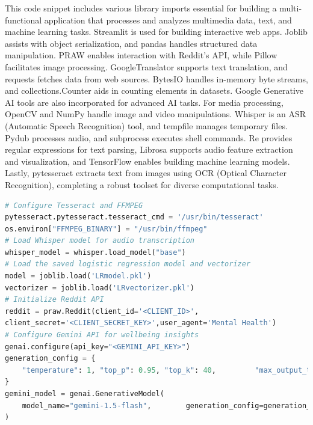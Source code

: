 \noindent
This code snippet includes various library imports essential for building a multi-functional application that processes and analyzes multimedia data, text, and machine learning tasks. Streamlit is used for building interactive web apps. Joblib assists with object serialization, and pandas handles structured data manipulation. PRAW enables interaction with Reddit's API, while Pillow facilitates image processing. GoogleTranslator supports text translation, and requests fetches data from web sources. BytesIO handles in-memory byte streams, and collections.Counter aids in counting elements in datasets. Google Generative AI tools are also incorporated for advanced AI tasks. For media processing, OpenCV and NumPy handle image and video manipulations. Whisper is an ASR (Automatic Speech Recognition) tool, and tempfile manages temporary files. Pydub processes audio, and subprocess executes shell commands. Re provides regular expressions for text parsing, Librosa supports audio feature extraction and visualization, and TensorFlow enables building machine learning models. Lastly, pytesseract extracts text from images using OCR (Optical Character Recognition), completing a robust toolset for diverse computational tasks.

\begin{tcolorbox}[colback=gray!5!white, colframe=gray!80!black, boxrule=0.5pt, title=Configuration and Model Initialization]
    \begin{lstlisting}[language=Python]
# Configure Tesseract and FFMPEG
pytesseract.pytesseract.tesseract_cmd = '/usr/bin/tesseract'
os.environ["FFMPEG_BINARY"] = "/usr/bin/ffmpeg"
# Load Whisper model for audio transcription
whisper_model = whisper.load_model("base")
# Load the saved logistic regression model and vectorizer
model = joblib.load('LRmodel.pkl')
vectorizer = joblib.load('LRvectorizer.pkl')
# Initialize Reddit API
reddit = praw.Reddit(client_id='<CLIENT_ID>',
client_secret='<CLIENT_SECRET_KEY>',user_agent='Mental Health')
# Configure Gemini API for wellbeing insights
genai.configure(api_key="<GEMINI_API_KEY>")
generation_config = {
    "temperature": 1, "top_p": 0.95, "top_k": 40,         "max_output_tokens": 8192, "response_mime_type": "text/plain",
}
gemini_model = genai.GenerativeModel(
    model_name="gemini-1.5-flash",        generation_config=generation_config,
)
    \end{lstlisting}
\end{tcolorbox}

